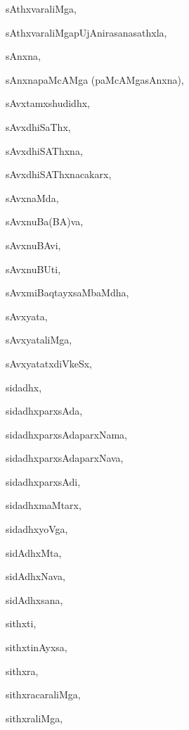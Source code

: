 \begin{multicols}{2}
{sAthxvaraliMga}, \pageref{sAthxvaraliMga}

{sAthxvaraliMgapUjAnirasanasathxla}, \pageref{sAthxvaraliMgapUjAnirasanasathxla}

{sAnxna}, \pageref{sAnxna}

{sAnxnapaMcAMga (paMcAMgasAnxna)}, \pageref{sAnxnapaMcAMgapaMcAMgasAnxna}

{sAvxtamxshudidhx}, \pageref{sAvxtamxshudidhx}

{sAvxdhiSaThx}, \pageref{sAvxdhiSaThx}

{sAvxdhiSAThxna}, \pageref{sAvxdhiSAThxna}

{sAvxdhiSAThxnacakarx}, \pageref{sAvxdhiSAThxnacakarx}

{sAvxnaMda}, \pageref{sAvxnaMda}

{sAvxnuBa(BA)va}, \pageref{sAvxnuBaBAva}

{sAvxnuBAvi}, \pageref{sAvxnuBAvi}

{sAvxnuBUti}, \pageref{sAvxnuBUti}

{sAvxmiBaqtayxsaMbaMdha}, \pageref{sAvxmiBaqtayxsaMbaMdha}

{sAvxyata}, \pageref{sAvxyata}

{sAvxyataliMga}, \pageref{sAvxyataliMga}

{sAvxyatatxdiVkeSx}, \pageref{sAvxyatatxdiVkeSx}

{sidadhx}, \pageref{sidadhx}

{sidadhxparxsAda}, \pageref{sidadhxparxsAda}

{sidadhxparxsAdaparxNama}, \pageref{sidadhxparxsAdaparxNama}

{sidadhxparxsAdaparxNava}, \pageref{sidadhxparxsAdaparxNava}

{sidadhxparxsAdi}, \pageref{sidadhxparxsAdi}

{sidadhxmaMtarx}, \pageref{sidadhxmaMtarx}

{sidadhxyoVga}, \pageref{sidadhxyoVga}

{sidAdhxMta}, \pageref{sidAdhxMta}

{sidAdhxNava}, \pageref{sidAdhxNava}

{sidAdhxsana}, \pageref{sidAdhxsana}

{sithxti}, \pageref{sithxti}

{sithxtinAyxsa}, \pageref{sithxtinAyxsa}

{sithxra}, \pageref{sithxra}

{sithxracaraliMga}, \pageref{sithxracaraliMga}

{sithxraliMga}, \pageref{sithxraliMga}


\end{multicols}
